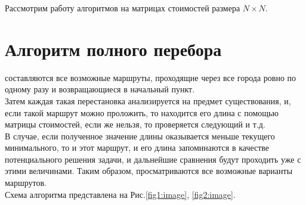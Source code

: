 Рассмотрим работу алгоритмов на матрицах стоимостей размера $N \times N$.

\section{Алгоритм полного перебора}
 составляются все возможные маршруты, проходящие через все города ровно по одному разу и возвращающиеся в начальный пункт.\\

Затем каждая такая перестановка анализируется на предмет существования, и, если такой маршрут можно проложить, то находится его длина с помощью матрицы стоимостей, если же нельзя, то проверяется следующий и т.д. \\

В случае, если полученное значение длины оказывается меньше текущего минимального, то и этот маршрут, и его длина запоминаются в качестве потенциального решения задачи, и дальнейшие сравнения будут проходить уже с этими величинами. Таким образом, просматриваются все возможные варианты маршрутов.\\

Схема алгоритма представлена на Рис.\ref{fig1:image}, \ref{fig2:image}.


